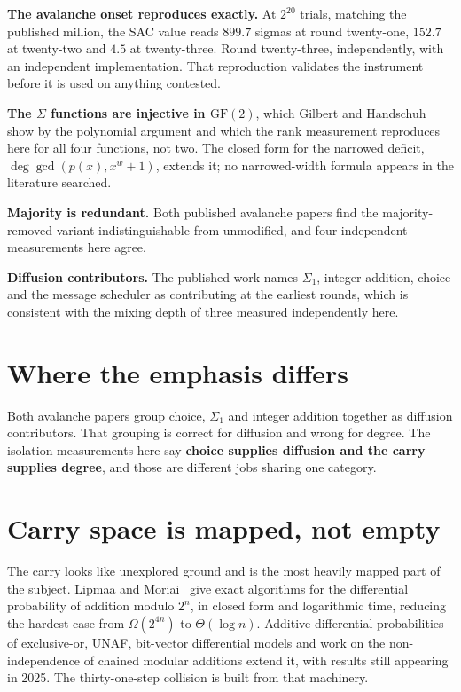 \textbf{The avalanche onset reproduces exactly.} At \(2^{20}\) trials, matching the published million, the SAC value reads \(899.7\) sigmas at round twenty-one, \(152.7\) at twenty-two and \(4.5\) at twenty-three. Round twenty-three, independently, with an independent implementation. That reproduction validates the instrument before it is used on anything contested.

\textbf{The \(\Sigma\) functions are injective in \(\mathrm{GF}(2)\)}, which Gilbert and Handschuh~\cite{src:Handschuh} show by the polynomial argument and which the rank measurement reproduces here for all four functions, not two. The closed form for the narrowed deficit, \(\deg \gcd(p(x), x^w+1)\), extends it; no narrowed-width formula appears in the literature searched.

\textbf{Majority is redundant.} Both published avalanche papers find the majority-removed variant indistinguishable from unmodified, and four independent measurements here agree.

\textbf{Diffusion contributors.} The published work names \(\Sigma_1\), integer addition, choice and the message scheduler as contributing at the earliest rounds, which is consistent with the mixing depth of three measured independently here.

\section{Where the emphasis differs}

Both avalanche papers group choice, \(\Sigma_1\) and integer addition together as diffusion contributors. That grouping is correct for diffusion and wrong for degree. The isolation measurements here say \textbf{choice supplies diffusion and the carry supplies degree}, and those are different jobs sharing one category.

\section{Carry space is mapped, not empty}

The carry looks like unexplored ground and is the most heavily mapped part of the subject. Lipmaa and Moriai~\cite{src:Lipmaa-and-Moriai} give exact algorithms for the differential probability of addition modulo \(2^n\), in closed form and logarithmic time, reducing the hardest case from \(\Omega(2^{4n})\) to \(\Theta(\log n)\). Additive differential probabilities of exclusive-or, UNAF, bit-vector differential models and work on the non-independence of chained modular additions extend it, with results still appearing in 2025. The thirty-one-step collision is built from that machinery.

